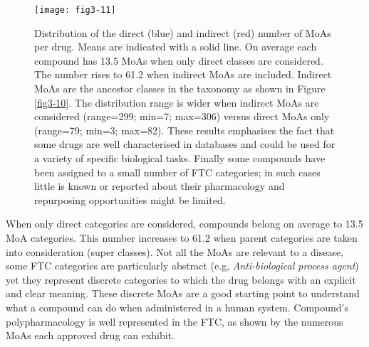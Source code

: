 \begin{figure}[H]
    \centering
    \texttt{[image: fig3-11]}
    \caption{Distribution of the direct (blue) and indirect (red) number of MoAs per drug. Means are indicated with a solid line. On average each compound has 13.5 MoAs when only direct classes are considered. The number rises
to 61.2 when indirect MoAs are included. Indirect MoAs are the ancestor classes in the taxonomy as shown in Figure \ref{fig3-10}. The distribution range is wider when indirect MoAs are considered (range=299; min=7; max=306) versus direct MoAs only (range=79; min=3; max=82). These results emphasises the fact that some drugs are well characterised in databases and could be used for a variety of specific biological tasks. Finally some compounds have been assigned to a small number of FTC categories; in such cases little is known or reported about their pharmacology and repurposing opportunities might be limited.}
    \label{fig3-11}
\end{figure}

When only direct categories are considered, compounds belong on average to 13.5 MoA categories. This number increases to 61.2 when parent categories are taken into consideration (super classes). Not all the MoAs are relevant to a disease, some FTC categories are particularly abstract (e.g, \emph{Anti-biological process agent}) yet they represent discrete categories to which the drug belongs with an explicit and clear meaning. These discrete MoAs are a good starting point to understand what a compound can do when administered in a human system. Compound's polypharmacology is well represented in the FTC, as shown by the numerous MoAs each approved drug can exhibit.

